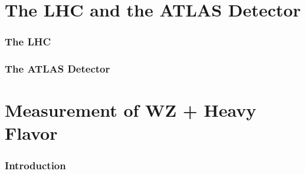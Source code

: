 \documentclass[NOTE, atlasdraft=true, texlive=2016, UKenglish]{\ATLASLATEXPATH atlasdoc}
\begin{document}

\part{The LHC and the ATLAS Detector}
\label{part:lhcAtlas}


\section{The LHC}
\label{sec:lhc}



\section{The ATLAS Detector}
\label{sec:atlas}


 
\part{Measurement of WZ + Heavy Flavor}                                                                                    
\label{part:wz}


\section{Introduction}                                                                                                      
\label{sec:intro}                                                                                                           
                                                                                                      
\end{document}
